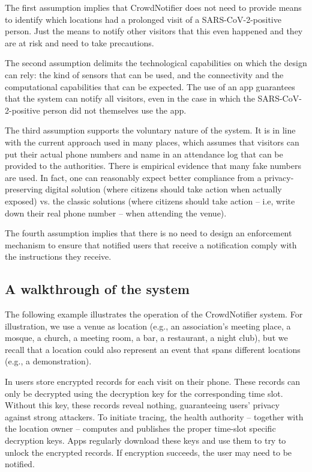 The first assumption implies that CrowdNotifier does not need to provide means to identify which locations had a prolonged visit of a SARS-CoV-2-positive person. Just the means to notify other visitors that this even happened and they are at risk and need to take precautions.

The second assumption delimits the technological capabilities on which the design can rely: the kind of sensors that can be used, and the connectivity and the computational capabilities that can be expected.
The use of an app guarantees that the system can notify all visitors, even in the case in which the SARS-CoV-2-positive person did not themselves use the app. 

The third assumption supports the voluntary nature of the system. It is in line with the current approach used in many places, which assumes that visitors can put their actual phone numbers and name in an attendance log that can be provided to the authorities. There is empirical evidence that many fake numbers are used. In fact, one can reasonably expect better compliance from a privacy-preserving digital solution (where citizens should take action when actually exposed) vs. the classic solutions (where citizens should take action -- i.e, write down their real phone number -- when attending the venue).

The fourth assumption implies that there is no need to design an enforcement mechanism to ensure that notified users that receive a notification comply with the instructions they receive.

\subsection{A walkthrough of the system}
The following example illustrates the operation of the CrowdNotifier system. For illustration, we use a venue as location (e.g., an association’s meeting place, a mosque, a church, a meeting room, a bar, a restaurant, a night club), but we recall that a location could also represent an event that spans different locations (e.g., a demonstration). 

In \name users store encrypted records for each visit on their phone. These
records can only be decrypted using the decryption key for the corresponding
time slot. Without this key, these records reveal nothing, guaranteeing users'
privacy against strong attackers. To initiate tracing, the health authority -- together with the location owner -- computes and publishes the proper time-slot specific decryption keys. Apps regularly download these keys and use them to try to unlock the encrypted records. If encryption succeeds, the user may need to be notified.

